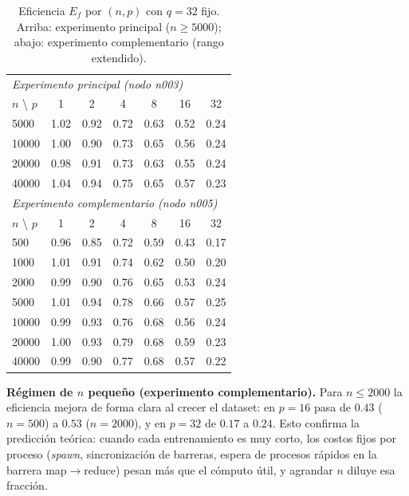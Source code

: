 \documentclass[11pt, a4paper]{article}
\begin{document}
\begin{table}[H]
\centering
\caption{Eficiencia $E_f$ por $(n, p)$ con $q = 32$ fijo. Arriba: experimento principal ($n \ge 5000$); abajo: experimento complementario (rango extendido).}
\label{tab:ef_n}
\small
\begin{tabular}{lcccccc}
\toprule
\multicolumn{7}{l}{\textit{Experimento principal (nodo n003)}} \\
$n$ \textbackslash{} $p$ & 1 & 2 & 4 & 8 & 16 & 32 \\
\midrule
5000  & 1.02 & 0.92 & 0.72 & 0.63 & 0.52 & 0.24 \\
10000 & 1.00 & 0.90 & 0.73 & 0.65 & 0.56 & 0.24 \\
20000 & 0.98 & 0.91 & 0.73 & 0.63 & 0.55 & 0.24 \\
40000 & 1.04 & 0.94 & 0.75 & 0.65 & 0.57 & 0.23 \\
\midrule
\multicolumn{7}{l}{\textit{Experimento complementario (nodo n005)}} \\
$n$ \textbackslash{} $p$ & 1 & 2 & 4 & 8 & 16 & 32 \\
\midrule
500   & 0.96 & 0.85 & 0.72 & 0.59 & 0.43 & 0.17 \\
1000  & 1.01 & 0.91 & 0.74 & 0.62 & 0.50 & 0.20 \\
2000  & 0.99 & 0.90 & 0.76 & 0.65 & 0.53 & 0.24 \\
5000  & 1.01 & 0.94 & 0.78 & 0.66 & 0.57 & 0.25 \\
10000 & 0.99 & 0.93 & 0.76 & 0.68 & 0.56 & 0.24 \\
20000 & 1.00 & 0.93 & 0.79 & 0.68 & 0.59 & 0.23 \\
40000 & 0.99 & 0.90 & 0.77 & 0.68 & 0.57 & 0.22 \\
\bottomrule
\end{tabular}
\end{table}

\textbf{Régimen de $n$ pequeño (experimento complementario).} Para $n \le 2000$ la eficiencia mejora de forma clara al crecer el dataset: en $p = 16$ pasa de $0.43$ ($n=500$) a $0.53$ ($n=2000$), y en $p = 32$ de $0.17$ a $0.24$. Esto confirma la predicción teórica: cuando cada entrenamiento es muy corto, los costos fijos por proceso (\textit{spawn}, sincronización de barreras, espera de procesos rápidos en la barrera map$\to$reduce) pesan más que el cómputo útil, y agrandar $n$ diluye esa fracción.
\end{document}
